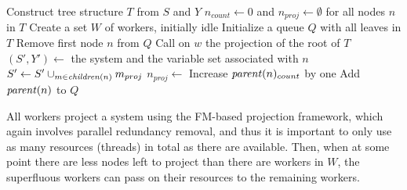 \begin{algorithmic}
	\State Construct  tree structure $T$ from $S$ and $Y$
	\State $n_{count}\gets 0$ and $n_{proj}\gets\emptyset$ for all nodes $n$ in $T$
	\State Create a set $W$ of workers, initially idle
	\State Initialize a queue $Q$ with all leaves in $T$
			\State Remove first node $n$ from $Q$
			\State Call  on $w$
		\EndIf
	\EndWhile
	\State \Return the projection of the root of $T$
\EndFunction
\Statex
{}
	\State $(S',Y')\gets$ the system and the variable set associated with $n$
	\State $S'\gets S'\cup_{m\in \mathit{children}(n)} m_{proj}$ 
	\State $n_{proj}\gets$ 
	\State Increase $\mathit{parent}(n)_{count}$ by one
		\State Add $\mathit{parent}(n)$ to $Q$
	\EndIf
	\State \Return
\EndFunction
\end{algorithmic}	
All workers project a system using the FM-based projection framework, which again involves parallel redundancy removal, and thus it is important to only use as many resources (threads) in total as there are available.
Then, when at some point there are less nodes left to project than there are workers in $W$, the superfluous workers can pass on their resources to the remaining workers.  
